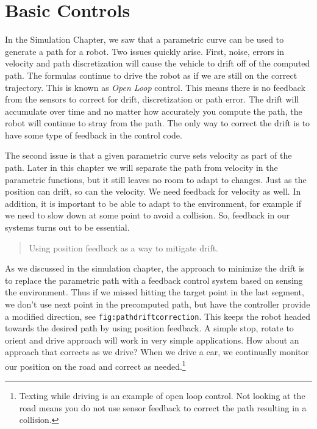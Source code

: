 \hypertarget{basic-controls}{%
\section{Basic Controls}\label{basic-controls}}

In the Simulation Chapter, we saw that a parametric curve can be used to
generate a path for a robot. Two issues quickly arise. First, noise,
errors in velocity and path discretization will cause the vehicle to
drift off of the computed path. The formulas continue to drive the robot
as if we are still on the correct trajectory. This is known as
\emph{Open Loop} control. This means there is no feedback from the
sensors to correct for drift, discretization or path error. The drift
will accumulate over time and no matter how accurately you compute the
path, the robot will continue to stray from the path. The only way to
correct the drift is to have some type of feedback in the control code.

The second issue is that a given parametric curve sets velocity as part
of the path. Later in this chapter we will separate the path from
velocity in the parametric functions, but it still leaves no room to
adapt to changes. Just as the position can drift, so can the velocity.
We need feedback for velocity as well. In addition, it is important to
be able to adapt to the environment, for example if we need to slow down
at some point to avoid a collision. So, feedback in our systems turns
out to be essential.

\begin{quote}
Using position feedback as a way to mitigate drift.
\end{quote}

As we discussed in the simulation chapter, the approach to minimize the
drift is to replace the parametric path with a feedback control system
based on sensing the environment. Thus if we missed hitting the target
point in the last segment, we don't use next point in the precomputed
path, but have the controller provide a modified direction, see
\texttt{fig:pathdriftcorrection}. This keeps the robot headed towards
the desired path by using position feedback. A simple stop, rotate to
orient and drive approach will work in very simple applications. How
about an approach that corrects as we drive? When we drive a car, we
continually monitor our position on the road and correct as
needed.\footnote{Texting while driving is an example of open loop
  control. Not looking at the road means you do not use sensor feedback
  to correct the path resulting in a collision.}

